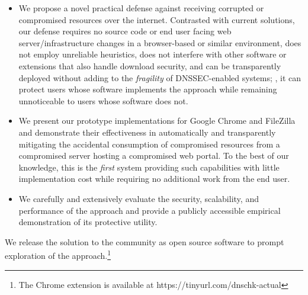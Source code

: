 \begin{itemize}

  \item We propose a novel practical defense against receiving corrupted or
  compromised resources over the internet. Contrasted with current solutions,
  our defense requires no source code or end user facing web
  server/infrastructure changes in a browser-based or similar environment, does
  not employ unreliable heuristics, does not interfere with other software or
  extensions that also handle download security, and can be transparently
  deployed without adding to the \textit{fragility} of DNSSEC-enabled systems;
  \ie, it can protect users whose software implements the \SYSTEM{} approach
  while remaining unnoticeable to users whose software does not.

  \item We present our prototype \SYSTEM{} implementations for Google Chrome and
  FileZilla and demonstrate their effectiveness in automatically and
  transparently mitigating the accidental consumption of compromised resources
  from a compromised server hosting a compromised web portal. To the best of our
  knowledge, this is the \emph{first} system providing such capabilities with
  little implementation cost while requiring no additional work from the end
  user.

  \item We carefully and extensively evaluate the security, scalability, and
  performance of the \SYSTEM{} approach and provide a publicly accessible
  empirical demonstration of its protective utility.

\end{itemize}

We release the \SYSTEM{} solution to the community as open source software to
prompt exploration of the \SYSTEM{} approach.\footnote{The \SYSTEM{} Chrome
extension is available at https://tinyurl.com/dnschk-actual}
